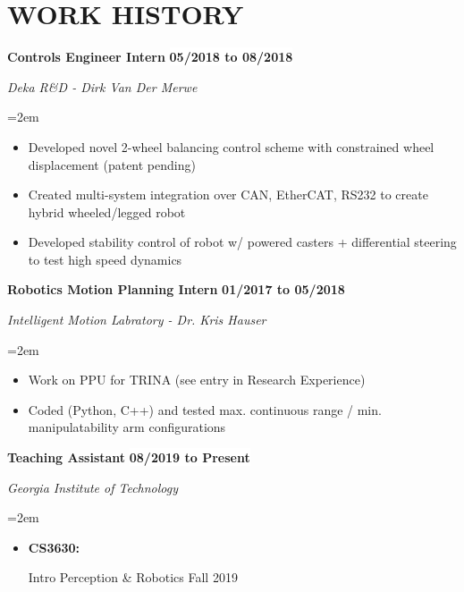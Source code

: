 \documentclass[paper=letter,fontsize=11pt]{scrartcl} %
\newcommand{\sepspace}{\vspace*{1em}}		%
\newcommand{\NewPart}[2]{\section*{\uppercase{#1} #2}}
\newcommand{\SkillsEntry}[2]{				  %
	\noindent \textbf{#1} \hfill \par      %
	\noindent\hangindent=2em\hangafter=0 \small #2 %
	\normalsize \par}  %
\newcommand{\EducationEntry}[4]{
		\noindent \textbf{#1} \hfill      %
		\colorbox{White}{%
			\bf 
			\parbox{10em}{%
			\hfill\color{Black}#2}} \par  %
		\noindent \textit{#3} \par        %
		\noindent\hangindent=2em\hangafter=0 \small #4 %
		\normalsize \par}
\newcommand{\WorkEntry}[4]{				  %
		\noindent \textbf{#1} \hfill      %
		\colorbox{White}{\bf \color{Black}#2} \par  %
		\noindent \textit{#3} \par              %
		\noindent\hangindent=2em\hangafter=0 \small #4 %
		\normalsize \par}
\begin{document}



\NewPart{Work History}{}

\WorkEntry{Controls Engineer Intern}{05/2018 to 08/2018}{Deka R\&D - Dirk Van Der Merwe}{
	\begin{itemize}
	\item Developed novel 2-wheel balancing control scheme with constrained wheel displacement (patent pending)
	\item Created multi-system integration over CAN, EtherCAT, RS232 to create hybrid wheeled/legged robot
	\item Developed stability control of robot w/ powered casters + differential steering to test high speed dynamics
	\end{itemize}
}
\sepspace

\WorkEntry{Robotics Motion Planning Intern}{01/2017 to 05/2018}{Intelligent Motion Labratory - Dr. Kris Hauser}{
	\begin{itemize}
	\item Work on PPU for TRINA (see entry in Research Experience)
	\item Coded (Python, C++) and tested max. continuous range / min. manipulatability arm configurations
	\end{itemize}
}

\sepspace
\WorkEntry{Teaching Assistant}{08/2019 to Present}{Georgia Institute of Technology}
{
	\begin{itemize}
		\item \parbox[t]{4.5em}{\bf CS3630:} Intro Perception \& Robotics \hfill Fall 2019
	\end{itemize}
}
\end{document}
